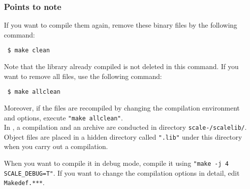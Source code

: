 \subsubsection{Points to note}

\noindent If you want to compile them again, remove these binary files by the following command:
\begin{verbatim}
 $ make clean
\end{verbatim}
Note that the library already compiled is not deleted in this command. If you want to remove all files, use the following command:
\begin{verbatim}
 $ make allclean
\end{verbatim}
Moreover, if the files are recompiled by changing the compilation environment and options,
execute \verb|"make allclean"|.\\


In \scalelib, a compilation and an archive are conducted in directory \texttt{scale-{\version}/scalelib/}.
Object files are placed in a hidden directory called \verb|".lib"| under this directory when you carry out a compilation.

When you want to compile it in debug mode, compile it using \verb|"make -j 4 SCALE_DEBUG=T"|.
If you want to change the compilation options in detail, edit \verb|Makedef.***|.





